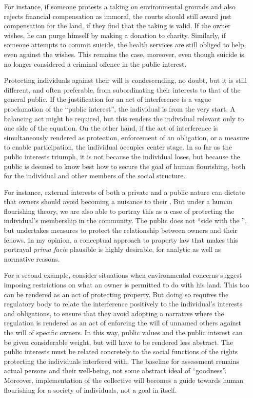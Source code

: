 For instance, if someone protests a taking on environmental grounds and also rejects financial compensation as immoral, the courts should still award just compensation for the land, if they find that the taking is valid. If the owner wishes, he can purge himself by making a donation to charity. Similarly, if someone attempts to commit suicide, the health services are still obliged to help, even against the  wishes. This remains the case, moreover, even though suicide is no longer considered a criminal offence in the public interest. 

Protecting individuals against their will is condescending, no doubt, but it is still different, and often preferable, from subordinating their interests to that of the general public. If the justification for an act of interference is a vague proclamation of the ``public interest'', the individual is  from the very start. A balancing act might be required, but this renders the individual relevant only to one side of the equation. On the other hand, if the act of interference is simultaneously rendered as protection, enforcement of an obligation, or a measure to enable participation, the individual occupies center stage. In so far as the public interests triumph, it is not because the individual loses, but because the public is deemed to know best how to secure the goal of human flourishing, both for the individual and other members of the social structure.

For instance, external interests of both a private and a public nature can dictate that owners should avoid becoming a nuisance to their . But under a human flourishing theory, we are also able to portray this as a case of protecting the individual's membership in the community. The public does not ``side with the '', but undertakes measures to protect the relationship between owners and their fellows. In my opinion, a conceptual approach to property law that makes this portrayal {\it prima facie} plausible is highly desirable, for analytic as well as normative reasons.

For a second example, consider situations when environmental concerns suggest imposing restrictions on what an owner is permitted to do with his land. This too can be rendered as an act of protecting property. But doing so requires the regulatory body to relate the interference positively to the individual's interests and obligations, to ensure that they avoid adopting a narrative where the regulation is rendered as an act of enforcing the will of unnamed others against the will of specific owners. In this way, public values and the public interest can be given considerable weight, but will have to be rendered less abstract. The public interests must be related concretely to the social functions of the rights protecting the individuals interfered with. The baseline for assessment remains actual persons and their well-being, not some abstract ideal of ``goodness''. Moreover, implementation of the collective will becomes a guide towards human flourishing for a society of individuals, not a goal in itself.

